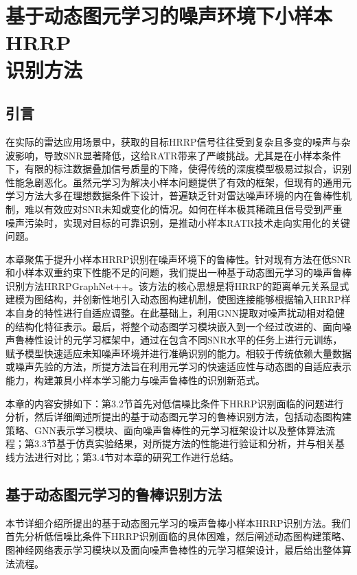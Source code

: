 \chapter[基于动态图元学习的噪声环境下小样本HRRP识别方法]{基于动态图元学习的噪声环境下小样本HRRP\protect\\ 识别方法}
\label{chap:noise_robust}

\section{引言}
\label{sec:noise_intro}

在实际的雷达应用场景中，获取的目标HRRP信号往往受到复杂且多变的噪声与杂波影响，导致SNR显著降低，这给RATR带来了严峻挑战。尤其是在小样本条件下，有限的标注数据叠加信号质量的下降，使得传统的深度模型极易过拟合，识别性能急剧恶化。虽然元学习为解决小样本问题提供了有效的框架，但现有的通用元学习方法大多在理想数据条件下设计，普遍缺乏针对雷达噪声环境的内在鲁棒性机制，难以有效应对SNR未知或变化的情况。如何在样本极其稀疏且信号受到严重噪声污染时，实现对目标的可靠识别，是推动小样本RATR技术走向实用化的关键问题。

本章聚焦于提升小样本HRRP识别在噪声环境下的鲁棒性。针对现有方法在低SNR和小样本双重约束下性能不足的问题，我们提出一种基于动态图元学习的噪声鲁棒识别方法HRRPGraphNet++。该方法的核心思想是将HRRP的距离单元关系显式建模为图结构，并创新性地引入动态图构建机制，使图连接能够根据输入HRRP样本自身的特性进行自适应调整。在此基础上，利用GNN提取对噪声扰动相对稳健的结构化特征表示。最后，将整个动态图学习模块嵌入到一个经过改进的、面向噪声鲁棒性设计的元学习框架中，通过在包含不同SNR水平的任务上进行元训练，赋予模型快速适应未知噪声环境并进行准确识别的能力。相较于传统依赖大量数据或噪声先验的方法，所提方法旨在利用元学习的快速适应性与动态图的自适应表示能力，构建兼具小样本学习能力与噪声鲁棒性的识别新范式。

本章的内容安排如下：第3.2节首先对低信噪比条件下HRRP识别面临的问题进行分析，然后详细阐述所提出的基于动态图元学习的鲁棒识别方法，包括动态图构建策略、GNN表示学习模块、面向噪声鲁棒性的元学习框架设计以及整体算法流程；第3.3节基于仿真实验结果，对所提方法的性能进行验证和分析，并与相关基线方法进行对比；第3.4节对本章的研究工作进行总结。

\section{基于动态图元学习的鲁棒识别方法}
\label{sec:methodology}

本节详细介绍所提出的基于动态图元学习的噪声鲁棒小样本HRRP识别方法。我们首先分析低信噪比条件下HRRP识别面临的具体困难，然后阐述动态图构建策略、图神经网络表示学习模块以及面向噪声鲁棒性的元学习框架设计，最后给出整体算法流程。

